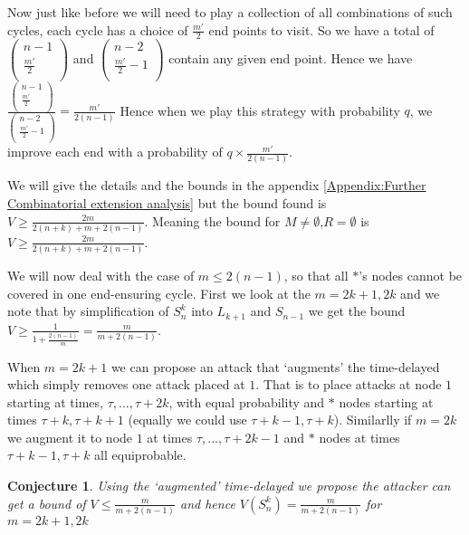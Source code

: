 \documentclass[a4paper,10pt]{article}
\newtheorem{conjecture}[theorem]{Conjecture}
\theoremstyle{definition}
\theoremstyle{definition}
\theoremstyle{remark}
\theoremstyle{definition}
\begin{document}
Now just like before we will need to play a collection of all combinations of such cycles, each cycle has a choice of $\frac{m'}{2}$ end points to visit. So we have a total of $\left( \begin{array}{c}
n-1 \\
\frac{m'}{2} \\
\end{array} \right)
$
and  $\left( \begin{array}{c}
n-2 \\
\frac{m'}{2}-1 \\
\end{array} \right)
$
contain any given end point. Hence we have $\frac{\left( \begin{array}{c}
n-1 \\
\frac{m'}{2} \\
\end{array} \right)}{\left( \begin{array}{c}
n-2 \\
\frac{m'}{2}-1 \\
\end{array} \right)}=
\frac{m'}{2(n-1)}
$
Hence when we play this strategy with probability $q$, we improve each end with a probability of $q \times \frac{m'}{2(n-1)}$.

We will give the details and the bounds in the appendix \ref{Appendix:Further Combinatorial extension analysis} but the bound found is $V \geq \frac{2m}{2(n+k)+m+2(n-1)}$. Meaning the bound for $M \neq \emptyset$,$R=\emptyset$ is $V \geq \frac{2m}{2(n+k)+m+2(n-1)}$.

We will now deal with the case of $m \leq 2(n-1)$, so that all $*$'s nodes cannot be covered in one end-ensuring cycle. First we look at the $m=2k+1,2k$ and we note that by simplification of $S^{k}_{n}$ into $L_{k+1}$ and $S_{n-1}$ we get the bound $V \geq \frac{1}{1+\frac{2(n-1)}{m}}=\frac{m}{m+2(n-1)}$.

When $m=2k+1$ we can propose an attack that `augments' the time-delayed which simply removes one attack placed at $1$. That is to place attacks at node $1$ starting at times, $\tau,...,\tau+2k$, with equal probability and $*$ nodes starting at times $\tau+k,\tau+k+1$ (equally we could use $\tau+k-1,\tau+k$). Similarlly if $m=2k$ we augment it to node $1$ at times $\tau,...,\tau+2k-1$ and $*$ nodes at times $\tau+k-1,\tau+k$ all equiprobable.

\begin{conjecture}
Using the `augmented' time-delayed we propose the attacker can get a bound of $V \leq \frac{m}{m+2(n-1)}$ and hence $V(S_{n}^{k})=\frac{m}{m+2(n-1)}$ for $m=2k+1,2k$
\end{conjecture}
\end{document}
